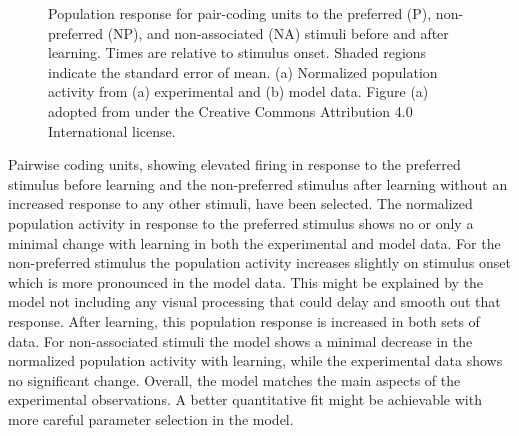 \begin{figure}
    \centering

    \vspace*{.75cm}
    \caption[Population response for pair-coding units.]{Population response for pair-coding units to the preferred (P), non-preferred (NP), and non-associated (NA) stimuli before and after learning. Times are relative to stimulus onset. Shaded regions indicate the standard error of mean. (a) Normalized population activity from (a) experimental and (b) model data. Figure (a) adopted from \textcite{ison2015} under the Creative Commons Attribution 4.0 International license.}\label{fig:aml-population-response}
\end{figure}
Pairwise coding units, showing elevated firing in response to the preferred stimulus before learning and the non-preferred stimulus after learning without an increased response to any other stimuli, have been selected.
The normalized population activity in response to the preferred stimulus shows no or only a minimal change with learning in both the experimental and model data.
For the non-preferred stimulus the population activity increases slightly on stimulus onset which is more pronounced in the model data.
This might be explained by the model not including any visual processing that could delay and smooth out that response.
After learning, this population response is increased in both sets of data.
For non-associated stimuli the model shows a minimal decrease in the normalized population activity with learning, while the experimental data shows no significant change.
Overall, the model matches the main aspects of the experimental observations.
A better quantitative fit might be achievable with more careful parameter selection in the model.


